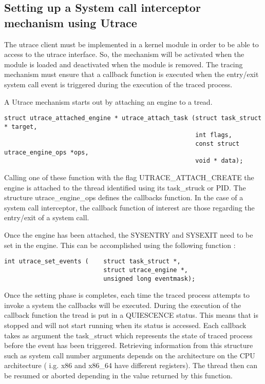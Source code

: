 \subsection{Setting up a System call interceptor mechanism using Utrace}
 

The utrace client must be implemented in a kernel module in order to be able to access to the utrace interface. So, the mechanism will be activated when the module is loaded and deactivated when the module is removed. The tracing mechanism must ensure that a callback function is executed when the entry/exit system call event is triggered during the execution of the traced process.

A Utrace mechanism starts out by attaching an engine to a tread.

\begin{lstlisting}
struct utrace_attached_engine * utrace_attach_task (struct task_struct * target, 
													int flags,
													const struct utrace_engine_ops *ops,
													void * data);
\end{lstlisting}

Calling one of these function with the flag UTRACE\_ATTACH\_CREATE the engine is attached to the thread identified using its task\_struck or PID. The structure utrace\_engine\_ops defines the callbacks function. In the case of a system call interceptor, the callback function of interest are those regarding the entry/exit of a system call. 

Once the engine has been attached, the SYSENTRY and SYSEXIT need to be set in the engine. This can be accomplished using the following function :

\begin{lstlisting}
int utrace_set_events (    struct task_struct *,
                           struct utrace_engine *,
                           unsigned long eventmask);
\end{lstlisting}

Once the setting phase is completes, each time the traced process attempts to invoke a system the callbacks will be executed. During the execution of the callback function the tread is put in a QUIESCENCE status. This means that is stopped and will not start running when its status is accessed. Each callback takes as argument the task\_struct which represents the state of traced process before the event has been triggered. Retrieving information from this structure such as system call number arguments depends on the architecture on the CPU architecture ( i.g. x86 and x86\_64 have different registers). The thread then can be resumed or aborted depending in the value returned by this function. 

